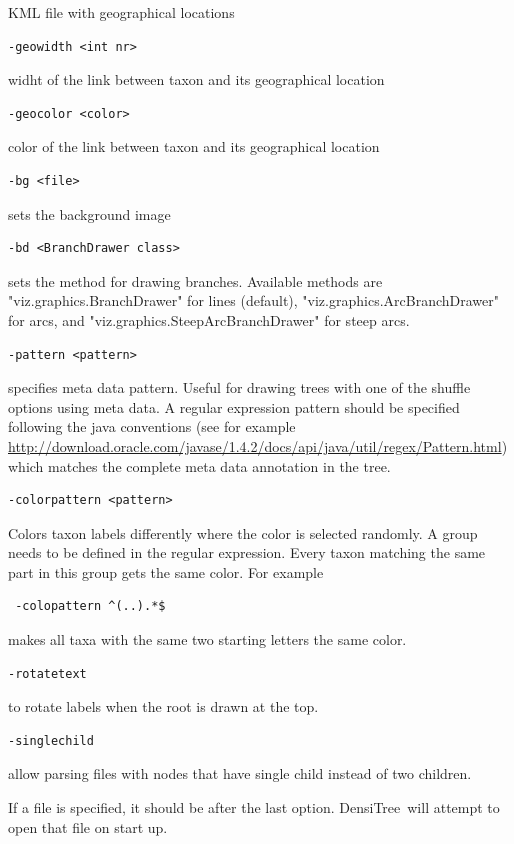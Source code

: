\documentclass{article}
\def\DensiTree{DensiTree}
\begin{document}
KML file with geographical locations
\begin{verbatim}-geowidth <int nr>\end{verbatim}
widht of the link between taxon and its geographical location
\begin{verbatim}-geocolor <color>\end{verbatim}
color of the link between taxon and its geographical location
\begin{verbatim}-bg <file>\end{verbatim}
sets the background image
\begin{verbatim}-bd <BranchDrawer class>\end{verbatim}
sets the method for drawing branches. Available methods are
"viz.graphics.BranchDrawer" for lines (default),
"viz.graphics.ArcBranchDrawer" for arcs, and
"viz.graphics.SteepArcBranchDrawer" for steep arcs.
\begin{verbatim}-pattern <pattern>\end{verbatim}
specifies meta data pattern. Useful for drawing trees with one of the
shuffle options using meta data. A regular expression pattern should be
specified following the java conventions (see for example
\url{http://download.oracle.com/javase/1.4.2/docs/api/java/util/regex/Pattern.html})
which matches the complete meta data annotation in the tree.
\begin{verbatim}-colorpattern <pattern>\end{verbatim}
Colors taxon labels differently where the color is selected randomly.
A group needs to be defined in the regular expression.
Every taxon matching the same part in this group gets the same color.
For example \begin{verbatim} -colopattern ^(..).*$\end{verbatim} makes all taxa with the same
two starting letters the same color.
\begin{verbatim}-rotatetext\end{verbatim}
to rotate labels when the root is drawn at the top.
\begin{verbatim}-singlechild\end{verbatim}
allow parsing files with nodes that have single child instead of two children.



If a file is specified, it should be after the last option. \DensiTree\ will attempt
to open that file on start up.
\end{document}
